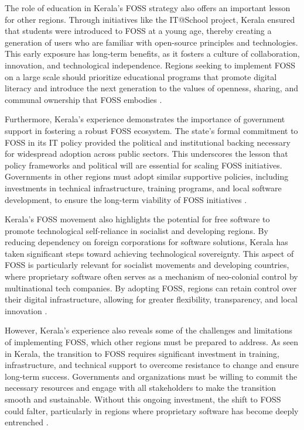 \begin{refsection}
The role of education in Kerala’s FOSS strategy also offers an important lesson for other regions. Through initiatives like the IT@School project, Kerala ensured that students were introduced to FOSS at a young age, thereby creating a generation of users who are familiar with open-source principles and technologies. This early exposure has long-term benefits, as it fosters a culture of collaboration, innovation, and technological independence. Regions seeking to implement FOSS on a large scale should prioritize educational programs that promote digital literacy and introduce the next generation to the values of openness, sharing, and communal ownership that FOSS embodies \cite[pp.~10-18]{prabhakar2010itschool}.

Furthermore, Kerala’s experience demonstrates the importance of government support in fostering a robust FOSS ecosystem. The state’s formal commitment to FOSS in its IT policy provided the political and institutional backing necessary for widespread adoption across public sectors. This underscores the lesson that policy frameworks and political will are essential for scaling FOSS initiatives. Governments in other regions must adopt similar supportive policies, including investments in technical infrastructure, training programs, and local software development, to ensure the long-term viability of FOSS initiatives \cite[pp.~22-23]{kerala2007itpolicy}.

Kerala’s FOSS movement also highlights the potential for free software to promote technological self-reliance in socialist and developing regions. By reducing dependency on foreign corporations for software solutions, Kerala has taken significant steps toward achieving technological sovereignty. This aspect of FOSS is particularly relevant for socialist movements and developing countries, where proprietary software often serves as a mechanism of neo-colonial control by multinational tech companies. By adopting FOSS, regions can retain control over their digital infrastructure, allowing for greater flexibility, transparency, and local innovation \cite[pp.~156-159]{palackal2007information}.

However, Kerala’s experience also reveals some of the challenges and limitations of implementing FOSS, which other regions must be prepared to address. As seen in Kerala, the transition to FOSS requires significant investment in training, infrastructure, and technical support to overcome resistance to change and ensure long-term success. Governments and organizations must be willing to commit the necessary resources and engage with all stakeholders to make the transition smooth and sustainable. Without this ongoing investment, the shift to FOSS could falter, particularly in regions where proprietary software has become deeply entrenched \cite[pp.~23-24]{kurup2020freedom}.


\end{refsection}
